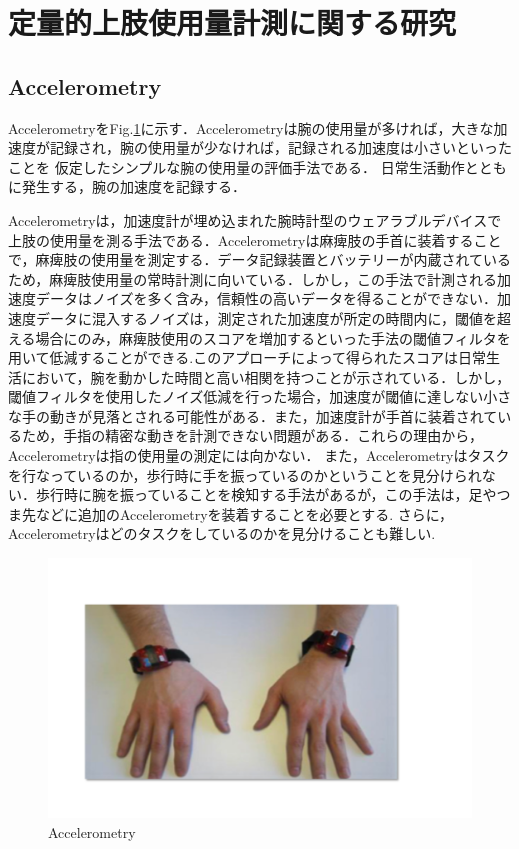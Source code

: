 \section{定量的上肢使用量計測に関する研究}
\subsection*{Accelerometry}
Accelerometry\cite{Chen2005,Hayward2016,Dwiputra2017,VanDerPas2011,VanDerLee2004,Thrane2011,Seitz2011}をFig.\ref{fig:Accelerometry}に示す．Accelerometryは腕の使用量が多ければ，大きな加速度が記録され，腕の使用量が少なければ，記録される加速度は小さいといったことを
仮定したシンプルな腕の使用量の評価手法である．
日常生活動作とともに発生する，腕の加速度を記録する．

Accelerometryは，加速度計が埋め込まれた腕時計型のウェアラブルデバイスで上肢の使用量を測る手法である．Accelerometryは麻痺肢の手首に装着することで，麻痺肢の使用量を測定する．データ記録装置とバッテリーが内蔵されているため，麻痺肢使用量の常時計測に向いている\cite{VanDerPas2011}．しかし，この手法で計測される加速度データはノイズを多く含み，信頼性の高いデータを得ることができない．加速度データに混入するノイズは，測定された加速度が所定の時間内に，閾値を超える場合にのみ，麻痺肢使用のスコアを増加するといった手法の閾値フィルタを用いて低減することができる.このアプローチによって得られたスコアは日常生活において，腕を動かした時間と高い相関を持つことが示されている．しかし，閾値フィルタを使用したノイズ低減を行った場合，加速度が閾値に達しない小さな手の動きが見落とされる可能性がある．また，加速度計が手首に装着されているため，手指の精密な動きを計測できない問題がある．これらの理由から，Accelerometryは指の使用量の測定には向かない\cite{Uswatte2000}．
また，Accelerometryはタスクを行なっているのか，歩行時に手を振っているのかということを見分けられない．歩行時に腕を振っていることを検知する手法があるが，この手法は，足やつま先などに追加のAccelerometryを装着することを必要とする\cite{Ullery2015}.
さらに，Accelerometryはどのタスクをしているのかを見分けることも難しい\cite{Hayward2016}.
\begin{figure}[H]
  \centering
  \includegraphics[width=0.8\linewidth]{fig/ch1/acc}
  \caption{Accelerometry\cite{Chen2005}}
  \label{fig:Accelerometry}
\end{figure}

